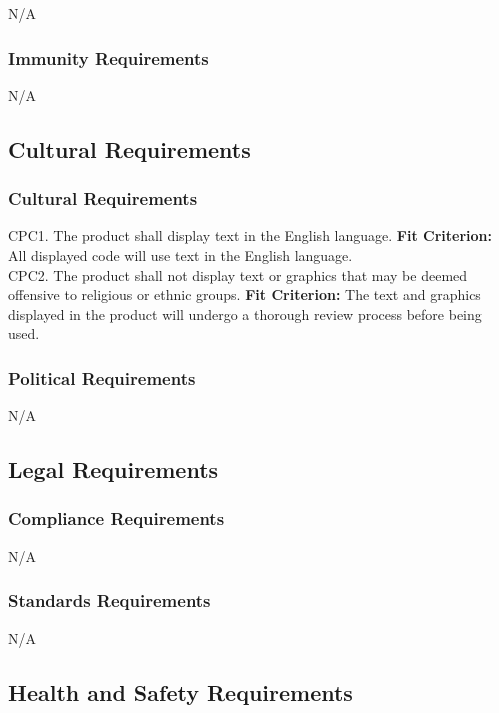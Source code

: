 \documentclass[12pt, titlepage]{article}
\begin{document}
N/A

\subsubsection{Immunity Requirements}

N/A

\subsection{Cultural Requirements}

\subsubsection{Cultural Requirements}

CPC1. The product shall display text in the English language.
  \textbf{Fit Criterion:} All displayed code will use text in the English language. \\

\noindent CPC2. The product shall not display text or graphics that may be deemed offensive to religious or ethnic groups.
	\textbf{Fit Criterion:} The text and graphics displayed in the product will undergo a thorough review process before being used. 

\subsubsection{Political Requirements}

N/A

\subsection{Legal Requirements}

\subsubsection{Compliance Requirements}

N/A

\subsubsection{Standards Requirements}

N/A

\subsection{Health and Safety Requirements}
\end{document}
